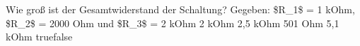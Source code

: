     {Wie groß ist der Gesamtwiderstand der Schaltung? Gegeben: \$R\_1\$ = 1 kOhm, \$R\_2\$ = 2000 Ohm und \$R\_3\$ = 2 kOhm}
    {2 kOhm}
    {2,5 kOhm}
    {501 Ohm}
    {5,1 kOhm}
    {true}{false}